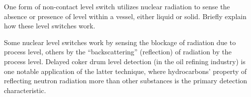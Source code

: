 

One form of non-contact level switch utilizes nuclear radiation to sense the absence or presence of level within a vessel, either liquid or solid.  Briefly explain how these level switches work.







Some nuclear level switches work by sensing the blockage of radiation due to process level, others by the ``backscattering'' (reflection) of radiation by the process level.  Delayed coker drum level detection (in the oil refining industry) is one notable application of the latter technique, where hydrocarbons' property of reflecting neutron radiation more than other substances is the primary detection characteristic.











